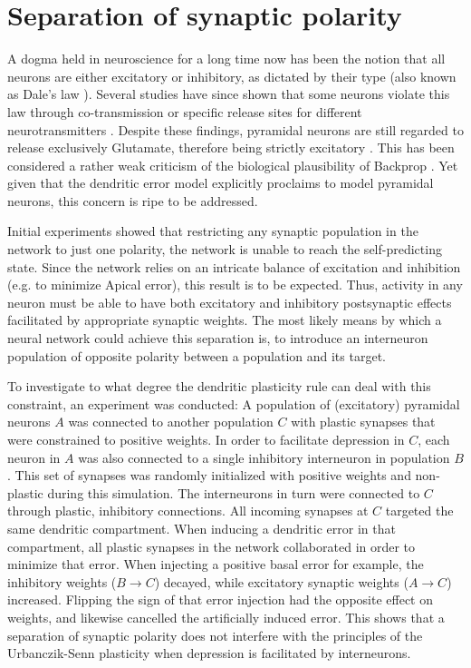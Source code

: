 \section{Separation of synaptic polarity}\label{sec-dales-law}


A dogma held in neuroscience for a long time now has been the notion that all neurons are either excitatory or
inhibitory, as dictated by their type (also known as Dale's law \citep{Kandel1968}). Several studies have since shown
that some neurons violate this law through co-transmission or specific release sites for different neurotransmitters
\citep{Svensson2019,Barranca2022}. Despite these findings, pyramidal neurons are still regarded to release exclusively
Glutamate, therefore being strictly excitatory \citep{gerfen2018long,spruston2008pyramidal,Eyal2018}. This has been
considered a rather weak criticism of the biological plausibility of Backprop \citep{Bartunov2018}. Yet given that the
dendritic error model explicitly proclaims to model pyramidal neurons, this concern is ripe to be addressed. 

Initial experiments showed that restricting any synaptic population in the network to just one polarity, the network is
unable to reach the self-predicting state. Since the network relies on an intricate balance of excitation and inhibition
(e.g. to minimize Apical error), this result is to be expected. Thus, activity in any neuron must be able to have both
excitatory and inhibitory postsynaptic effects facilitated by appropriate synaptic weights. The most likely means by
which a neural network could achieve this separation is, to introduce an interneuron population of opposite polarity
between a population and its target.


To investigate to what degree the dendritic plasticity rule can deal with this constraint, an experiment was conducted:
A population of (excitatory) pyramidal neurons $A$  was connected to another population $C$ with plastic synapses that
were constrained to positive weights. In order to facilitate depression in $C$, each neuron in $A$ was also connected to
a single inhibitory interneuron in population $B$. This set of synapses was randomly initialized with positive weights and
non-plastic during this simulation. The interneurons in turn were connected to $C$ through plastic, inhibitory
connections. All incoming synapses at $C$ targeted the same dendritic compartment. When inducing a dendritic error in
that compartment, all plastic synapses in the network collaborated in order to minimize that error. When injecting a
positive basal error for example, the inhibitory weights ($B \rightarrow C$) decayed, while excitatory synaptic weights
($A \rightarrow C$) increased. Flipping the sign of that error injection had the opposite effect on weights, and
likewise cancelled the artificially induced error. This shows that a separation of synaptic polarity does not interfere
with the principles of the Urbanczik-Senn plasticity when depression is facilitated by interneurons.


